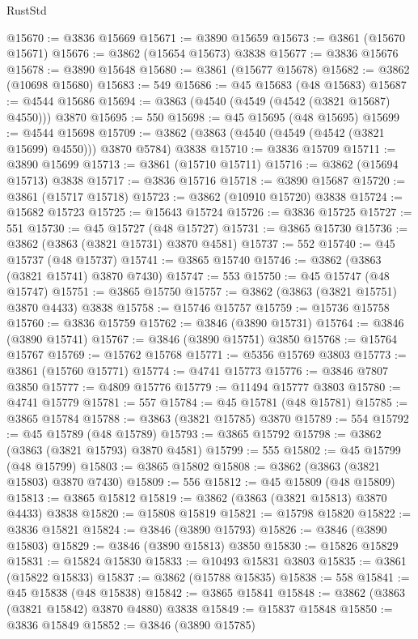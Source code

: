 \begin{lexlean}{RustStd}
\begin{coremodule}
@15670 := @3836 @15669
@15671 := @3890 @15659
@15673 := @3861 (@15670 @15671)
@15676 := @3862 (@15654 @15673) @3838
@15677 := @3836 @15676
@15678 := @3890 @15648
@15680 := @3861 (@15677 @15678)
@15682 := @3862 (@10698 @15680)
@15683 := 549
@15686 := @45 @15683 (@48 @15683)
@15687 := @4544 @15686
@15694 := @3863 (@4540 (@4549 (@4542 (@3821 @15687) @4550))) @3870
@15695 := 550
@15698 := @45 @15695 (@48 @15695)
@15699 := @4544 @15698
@15709 := @3862 (@3863 (@4540 (@4549 (@4542 (@3821 @15699) @4550))) @3870 @5784) @3838
@15710 := @3836 @15709
@15711 := @3890 @15699
@15713 := @3861 (@15710 @15711)
@15716 := @3862 (@15694 @15713) @3838
@15717 := @3836 @15716
@15718 := @3890 @15687
@15720 := @3861 (@15717 @15718)
@15723 := @3862 (@10910 @15720) @3838
@15724 := @15682 @15723
@15725 := @15643 @15724
@15726 := @3836 @15725
@15727 := 551
@15730 := @45 @15727 (@48 @15727)
@15731 := @3865 @15730
@15736 := @3862 (@3863 (@3821 @15731) @3870 @4581)
@15737 := 552
@15740 := @45 @15737 (@48 @15737)
@15741 := @3865 @15740
@15746 := @3862 (@3863 (@3821 @15741) @3870 @7430)
@15747 := 553
@15750 := @45 @15747 (@48 @15747)
@15751 := @3865 @15750
@15757 := @3862 (@3863 (@3821 @15751) @3870 @4433) @3838
@15758 := @15746 @15757
@15759 := @15736 @15758
@15760 := @3836 @15759
@15762 := @3846 (@3890 @15731)
@15764 := @3846 (@3890 @15741)
@15767 := @3846 (@3890 @15751) @3850
@15768 := @15764 @15767
@15769 := @15762 @15768
@15771 := @5356 @15769 @3803
@15773 := @3861 (@15760 @15771)
@15774 := @4741 @15773
@15776 := @3846 @7807 @3850
@15777 := @4809 @15776
@15779 := @11494 @15777 @3803
@15780 := @4741 @15779
@15781 := 557
@15784 := @45 @15781 (@48 @15781)
@15785 := @3865 @15784
@15788 := @3863 (@3821 @15785) @3870
@15789 := 554
@15792 := @45 @15789 (@48 @15789)
@15793 := @3865 @15792
@15798 := @3862 (@3863 (@3821 @15793) @3870 @4581)
@15799 := 555
@15802 := @45 @15799 (@48 @15799)
@15803 := @3865 @15802
@15808 := @3862 (@3863 (@3821 @15803) @3870 @7430)
@15809 := 556
@15812 := @45 @15809 (@48 @15809)
@15813 := @3865 @15812
@15819 := @3862 (@3863 (@3821 @15813) @3870 @4433) @3838
@15820 := @15808 @15819
@15821 := @15798 @15820
@15822 := @3836 @15821
@15824 := @3846 (@3890 @15793)
@15826 := @3846 (@3890 @15803)
@15829 := @3846 (@3890 @15813) @3850
@15830 := @15826 @15829
@15831 := @15824 @15830
@15833 := @10493 @15831 @3803
@15835 := @3861 (@15822 @15833)
@15837 := @3862 (@15788 @15835)
@15838 := 558
@15841 := @45 @15838 (@48 @15838)
@15842 := @3865 @15841
@15848 := @3862 (@3863 (@3821 @15842) @3870 @4880) @3838
@15849 := @15837 @15848
@15850 := @3836 @15849
@15852 := @3846 (@3890 @15785)

\end{coremodule}
\end{lexlean}
